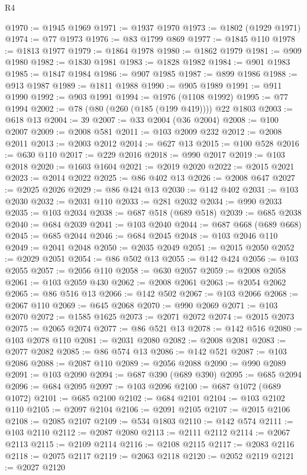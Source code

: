 \begin{lexlean}{R4}
\begin{coremodule}
@1970 := @1945 @1969
@1971 := @1937 @1970
@1973 := @1802 (@1929 @1971)
@1974 := @77 @1973
@1976 := @83 @1799 @869
@1977 := @1845 @110
@1978 := @1813 @1977
@1979 := @1864 @1978
@1980 := @1862 @1979
@1981 := @909 @1980
@1982 := @1830 @1981
@1983 := @1828 @1982
@1984 := @901 @1983
@1985 := @1847 @1984
@1986 := @907 @1985
@1987 := @899 @1986
@1988 := @913 @1987
@1989 := @1811 @1988
@1990 := @905 @1989
@1991 := @911 @1990
@1992 := @903 @1991
@1994 := @1976 (@1108 @1992)
@1995 := @77 @1994
@2002 := @78 (@80 (@260 (@185 (@199 @419)))) @22 @1803
@2003 := @618 @13
@2004 := 39
@2007 := @33 @2004 (@36 @2004)
@2008 := @100 @2007
@2009 := @2008 @581
@2011 := @103 @2009 @232
@2012 := @2008 @2011
@2013 := @2003 @2012
@2014 := @627 @13
@2015 := @100 @528
@2016 := @630 @110
@2017 := @229 @2016
@2018 := @990 @2017
@2019 := @103 @2018
@2020 := @1603 @1604
@2021 := @2019 @2020
@2022 := @2015 @2021
@2023 := @2014 @2022
@2025 := @86 @402 @13
@2026 := @2008 @647
@2027 := @2025 @2026
@2029 := @86 @424 @13
@2030 := @142 @402
@2031 := @103 @2030
@2032 := @2031 @110
@2033 := @281 @2032
@2034 := @990 @2033
@2035 := @103 @2034
@2038 := @687 @518 (@689 @518)
@2039 := @685 @2038
@2040 := @684 @2039
@2041 := @103 @2040
@2044 := @687 @668 (@689 @668)
@2045 := @685 @2044
@2046 := @684 @2045
@2048 := @103 @2046 @110
@2049 := @2041 @2048
@2050 := @2035 @2049
@2051 := @2015 @2050
@2052 := @2029 @2051
@2054 := @86 @502 @13
@2055 := @142 @424
@2056 := @103 @2055
@2057 := @2056 @110
@2058 := @630 @2057
@2059 := @2008 @2058
@2061 := @103 @2059 @430
@2062 := @2008 @2061
@2063 := @2054 @2062
@2065 := @86 @516 @13
@2066 := @142 @502
@2067 := @103 @2066
@2068 := @2067 @110
@2069 := @645 @2068
@2070 := @990 @2069
@2071 := @103 @2070
@2072 := @1585 @1625
@2073 := @2071 @2072
@2074 := @2015 @2073
@2075 := @2065 @2074
@2077 := @86 @521 @13
@2078 := @142 @516
@2080 := @103 @2078 @110
@2081 := @2031 @2080
@2082 := @2008 @2081
@2083 := @2077 @2082
@2085 := @86 @574 @13
@2086 := @142 @521
@2087 := @103 @2086
@2088 := @2087 @110
@2089 := @2056 @2088
@2090 := @990 @2089
@2091 := @103 @2090
@2094 := @687 @390 (@689 @390)
@2095 := @685 @2094
@2096 := @684 @2095
@2097 := @103 @2096
@2100 := @687 @1072 (@689 @1072)
@2101 := @685 @2100
@2102 := @684 @2101
@2104 := @103 @2102 @110
@2105 := @2097 @2104
@2106 := @2091 @2105
@2107 := @2015 @2106
@2108 := @2085 @2107
@2109 := @534 @1803
@2110 := @142 @574
@2111 := @103 @2110
@2112 := @2087 @2080
@2113 := @2111 @2112
@2114 := @2067 @2113
@2115 := @2109 @2114
@2116 := @2108 @2115
@2117 := @2083 @2116
@2118 := @2075 @2117
@2119 := @2063 @2118
@2120 := @2052 @2119
@2121 := @2027 @2120

\end{coremodule}
\end{lexlean}
